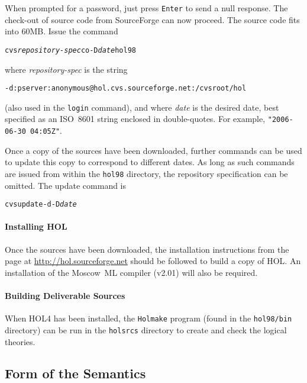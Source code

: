 \documentclass[11pt]{article}
\begin{document}
When prompted for a password, just press \texttt{Enter} to send a null
response.  The check-out of source code from SourceForge can now
proceed.  The source code fits into 60MB.  Issue the command

{\small
\begin{alltt}
   cvs \textit{repository-spec} co -D \textit{date} hol98
\end{alltt}
}

\noindent where \textit{\ttfamily repository-spec} is the string

{\small
\begin{alltt}
   -d:pserver:anonymous@hol.cvs.sourceforge.net:/cvsroot/hol
\end{alltt}
}

\noindent (also used in the \texttt{login} command), and where
\textit{\ttfamily date} is the desired date, best specified as an
ISO~8601 string enclosed in double-quotes.  For example,
\texttt{"2006-06-30 04:05Z"}.

Once a copy of the sources have been downloaded, further commands can
be used to update this copy to correspond to different dates.  As long
as such commands are issued from within the \texttt{hol98} directory,
the repository specification can be omitted.  The update command is

{\small
\begin{alltt}
   cvs update -d -D \textit{date}
\end{alltt}
}

\paragraph{Installing HOL} Once the sources have been downloaded, the
installation instructions from the page at
\url{http://hol.sourceforge.net} should be followed to build a copy of
HOL.  An installation of the Moscow~ML compiler (v2.01) will also be
required.

\paragraph{Building Deliverable Sources}
When HOL4 has been installed, the \texttt{Holmake} program (found in
the \texttt{hol98/bin} directory) can be run in the \texttt{holsrcs}
directory to create and check the logical theories.

\subsection{Form of the Semantics}
\end{document}
